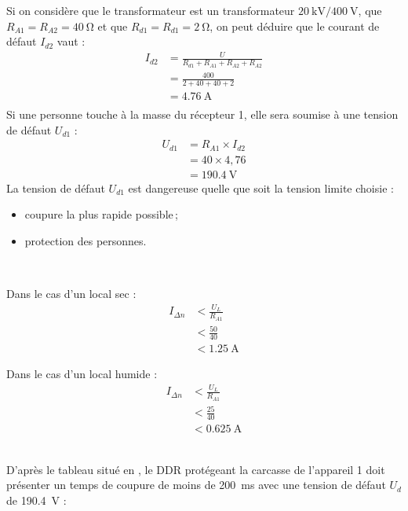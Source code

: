 \begin{exemple}
Si on considère que le transformateur est un transformateur $\SI{20}{\kilo\volt}/\SI{400}{\volt}$, que $R_{A1}=R_{A2}=\SI{40}{\ohm}$ et que $R_{d1} =R_{d1}= \SI{2}{\ohm}$, on peut déduire que le courant de défaut $I_{d2}$ vaut :
\begin{align*}
		I_{d2} &= \frac{U}{R_{d1}+R_{A1}+R_{A2}+R_{A2}} \\
					&=\frac{400}{2+40+40+2} \\
				&= \SI{4,76}{\ampere} \\
\end{align*}
Si une personne touche à la masse du récepteur 1, elle sera soumise à une tension de défaut $U_{d1}$ :
\begin{align*}
		U_{d1} &= R_{A1} \times I_{d2} \\
				&=40 \times 4,76 \\
				&= \SI{190,4}{\volt}
\end{align*}
La tension de défaut $U_{d1}$ est dangereuse quelle que soit la tension limite choisie :
\begin{itemize}
\item coupure la plus rapide possible\,;
\item protection des personnes.
\end{itemize}
~\\
\begin{minipage}[t]{0.5\linewidth}
Dans le cas d'un local sec :
\begin{align*}
	I_{\Delta n} 	&< \frac{U_{L}}{R_{A1}} \\
						&< \frac{50}{40} \\
						&< \SI{1,25}{\ampere}
\end{align*}
\end{minipage}
\hfill
\begin{minipage}[t]{0.5\linewidth}
Dans le cas d'un local humide :
\begin{align*}
	I_{\Delta n} 	&< \frac{U_{L}}{R_{A1}} \\
						&< \frac{25}{40} \\
						&< \SI{0,625}{\ampere}
\end{align*}
\end{minipage}
~\\
D'après le tableau situé en , le DDR protégeant la carcasse de l'appareil 1 doit présenter un temps de coupure de moins de \SI{200}{\milli\second} avec une tension de défaut $U_d$ de \SI{190,4}{\volt} :


\end{exemple}
